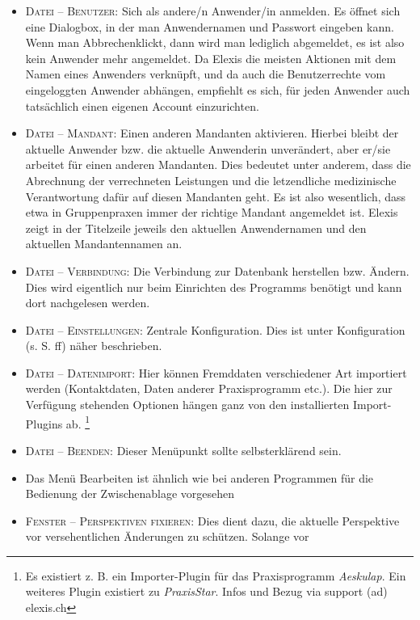 \begin{itemize}
  \item {\textsc{Datei -- Benutzer}: Sich als andere/n Anwender/in anmelden. Es
  öffnet sich eine Dialogbox, in der man Anwendernamen und Passwort eingeben
  kann. Wenn man \glqq Abbrechen\grqq{}klickt, dann wird man lediglich
  abgemeldet, es ist also kein Anwender mehr angemeldet. Da Elexis die meisten
  Aktionen mit dem Namen eines Anwenders verknüpft, und da auch die
  Benutzerrechte vom eingeloggten Anwender abhängen, empfiehlt es sich, für
  jeden Anwender auch tatsächlich einen eigenen Account einzurichten. }
  \item {\textsc{Datei -- Mandant}: Einen anderen Mandanten aktivieren. Hierbei
  bleibt der aktuelle Anwender bzw. die aktuelle Anwenderin unverändert, aber
  er/sie arbeitet für einen anderen Mandanten. Dies bedeutet unter anderem, dass
  die Abrechnung der verrechneten Leistungen und die letzendliche medizinische
  Verantwortung dafür auf diesen Mandanten geht. Es ist also wesentlich, dass
  etwa in Gruppenpraxen immer der richtige Mandant angemeldet ist. Elexis zeigt
  in der Titelzeile jeweils den aktuellen Anwendernamen und den aktuellen
  Mandantennamen an.}
  \item {\textsc{Datei -- Verbindung}: Die Verbindung zur Datenbank herstellen
  bzw. Ändern. Dies wird eigentlich nur beim Einrichten des Programms benötigt
  und kann dort nachgelesen werden.}
  \item {\textsc{Datei -- Einstellungen}: Zentrale Konfiguration. Dies ist
  unter Konfiguration (s. S. \pageref{settings} ff) näher beschrieben.}
  \item {\textsc{Datei -- Datenimport}: Hier können Fremd\-daten verschie\-de\-ner
  Art impor\-tiert werden (Kontakt\-daten, Da\-ten anderer Praxis\-programm etc.). Die
  hier zur Ver\-fü\-gung ste\-hen\-den Op\-tio\-nen hängen ganz von den instal\-lier\-ten
  Import-Plugins ab.} \footnote{Es existiert z. B. ein Importer-Plugin für das Praxisprogramm \textit{Aeskulap}. Ein weiteres Plugin existiert zu \textit{PraxisStar}. Infos und Bezug via support (ad) elexis.ch}
  \item {\textsc{Datei -- Beenden}: Dieser Menüpunkt sollte selbsterklärend
  sein.}
  \item {Das Menü \glqq Bearbeiten\grqq{} ist ähnlich wie bei anderen Programmen
  für die Bedienung der Zwischenablage vorgesehen}
  \item {\textsc{Fenster -- Perspektiven fixieren}: Dies dient dazu, die
  aktuelle Perspektive vor versehentlichen Änderungen zu schützen. Solange vor
}
\end{itemize}
